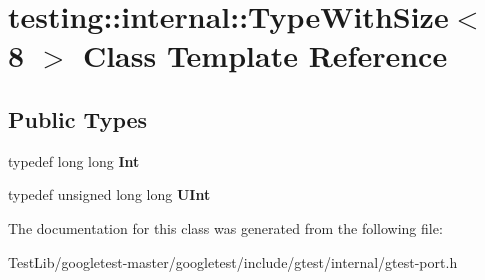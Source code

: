 \hypertarget{classtesting_1_1internal_1_1TypeWithSize_3_018_01_4}{}\section{testing\+:\+:internal\+:\+:Type\+With\+Size$<$ 8 $>$ Class Template Reference}
\label{classtesting_1_1internal_1_1TypeWithSize_3_018_01_4}
\subsection*{Public Types}
\begin{DoxyCompactItemize}
\item 
\mbox{\label{classtesting_1_1internal_1_1TypeWithSize_3_018_01_4_a36d5697e5f5254b0495f13c97d747e36}} 
typedef long long {\bfseries Int}
\item 
\mbox{\label{classtesting_1_1internal_1_1TypeWithSize_3_018_01_4_a747e21c5aee8faf07ec65cd4c3d1ca62}} 
typedef unsigned long long {\bfseries U\+Int}
\end{DoxyCompactItemize}


The documentation for this class was generated from the following file\+:\begin{DoxyCompactItemize}
\item 
Test\+Lib/googletest-\/master/googletest/include/gtest/internal/gtest-\/port.\+h\end{DoxyCompactItemize}
